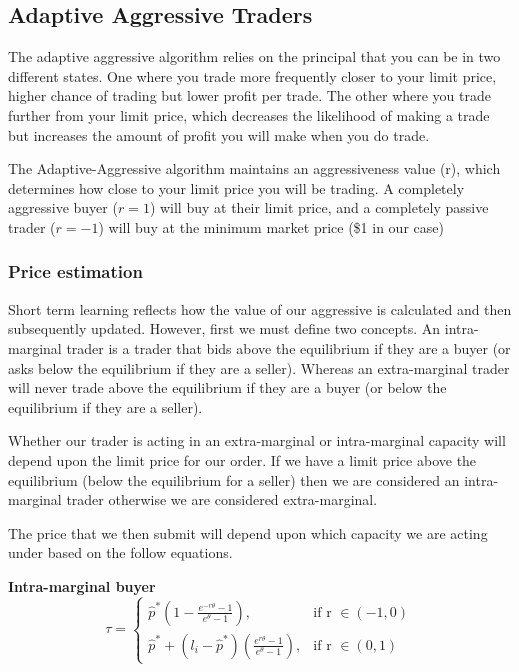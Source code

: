\documentclass{acm_proc_article-sp}
\begin{document}
\pagebreak
\subsection{Adaptive Aggressive Traders} \label{sec:AA}
The adaptive aggressive algorithm relies on the principal that you can be in
two different states. One where you trade more frequently closer to your limit
price, higher chance of trading but lower profit per trade. The other where you
trade further from your limit price, which decreases the likelihood of making a
trade but increases the amount of profit you will make when you do trade.

The Adaptive-Aggressive algorithm maintains an aggressiveness value (r), which
determines how close to your limit price you will be trading. A completely
aggressive buyer ($r = 1$) will buy at their limit price, and a completely
passive trader ($r = -1$) will buy at the minimum market price (\$1 in our case)

\subsubsection{Price estimation} \label{sec:AA_price_estimation}
Short term learning reflects how the value of our aggressive is calculated and
then subsequently updated. However, first we must define two concepts. An
intra-marginal trader is a trader that bids above the equilibrium if they are a
buyer (or asks below the equilibrium if they are a seller). Whereas an
extra-marginal trader will never trade above the equilibrium if they are a
buyer (or below the equilibrium if they are a seller).

Whether our trader is acting in an extra-marginal or intra-marginal capacity
will depend upon the limit price for our order. If we have a limit price above
the equilibrium (below the equilibrium for a seller) then we are considered an
intra-marginal trader otherwise we are considered extra-marginal.

The price that we then submit will depend upon which capacity we are acting
under based on the follow equations.

\textbf{Intra-marginal buyer}
\begin{equation}
\tau =
\begin{cases}
      \hat{p}^*(1- \frac{e^{-r\theta}-1}{e^{\theta}-1}), &  \text{if r } \in (-1,0)  \\
      \hat{p}^* + (l_i-\hat{p}^*)(\frac{e^{r\theta}-1}{e^\theta-1}), & \text{if
      r } \in (0,1)
\end{cases}
\label{intrabuyer}
\end{equation}
\end{document}

